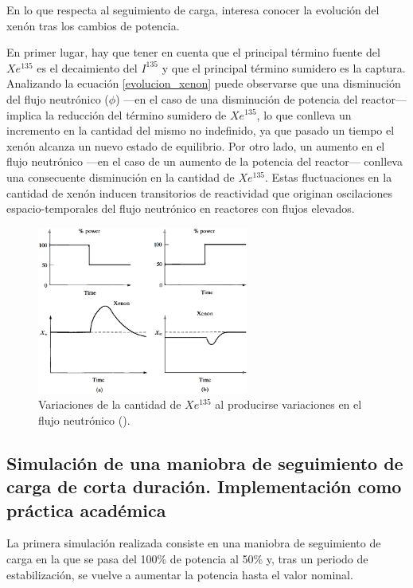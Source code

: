 En lo que respecta al seguimiento de carga, interesa conocer la evolución del xenón tras los cambios de potencia. 

En primer lugar, hay que tener en cuenta que el principal término fuente del $Xe^{135}$ es el decaimiento del $I^{135}$ y que el principal término sumidero es la captura. Analizando la ecuación \ref{evolucion_xenon} puede observarse que una disminución del flujo neutrónico ($\phi$) ---en el caso de una disminución de potencia del reactor--- implica la reducción del término sumidero de  $Xe^{135}$, lo que conlleva un incremento en la cantidad del mismo no indefinido, ya que pasado un tiempo el xenón alcanza un nuevo estado de equilibrio. Por otro lado, un aumento en el flujo neutrónico ---en el caso de un aumento de la potencia del reactor--- conlleva una consecuente disminución en la cantidad de $Xe^{135}$. Estas fluctuaciones en la cantidad de xenón inducen transitorios de reactividad que
originan oscilaciones espacio-temporales del flujo neutrónico en reactores con flujos elevados.

\begin{figure}[h]
  \centering
  \includegraphics[width=0.62\textwidth]{content/figures/variaciones_potencia_xenon.png}
  \caption{Variaciones de la cantidad de $Xe^{135}$ al producirse variaciones en el flujo neutrónico (\cite{intro_nuclear_engineering}).}
  \label{fig:variaciones_potencia_xenon}
\end{figure}

\subsection{Simulación de una maniobra de seguimiento de carga de corta duración. Implementación como práctica académica}

La primera simulación realizada consiste en una maniobra de seguimiento de carga en la que se pasa del 100\% de potencia al 50\% y, tras un periodo de estabilización, se vuelve a aumentar la potencia hasta el valor nominal.

